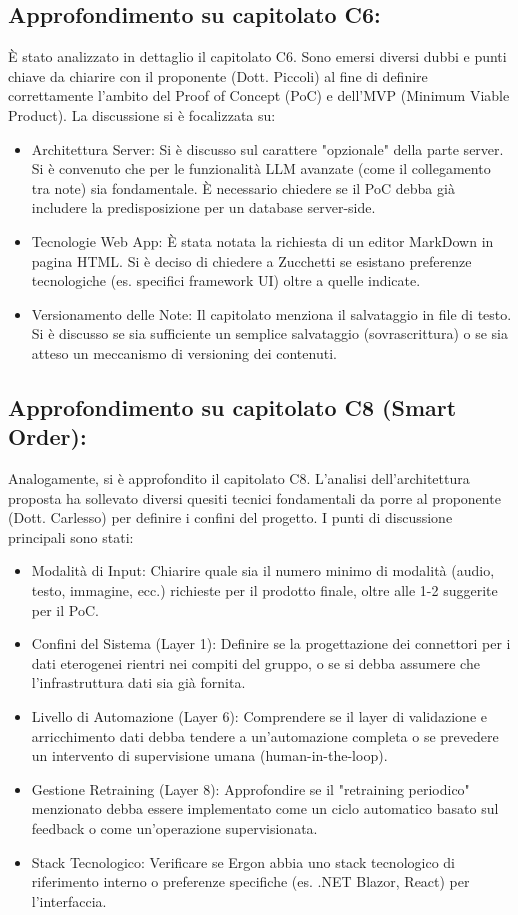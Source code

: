 \documentclass[a4paper, 11pt, oneside]{scrartcl} %
\begin{document}
\subsection{Approfondimento su capitolato C6:}
È stato analizzato in dettaglio il capitolato C6. Sono emersi diversi dubbi e punti chiave da chiarire con il proponente (Dott. Piccoli) al fine di definire correttamente l'ambito del Proof of Concept (PoC) e dell'MVP (Minimum Viable Product). 
La discussione si è focalizzata su:
\begin{itemize}
    \item Architettura Server: Si è discusso sul carattere "opzionale" della parte server. Si è convenuto che per le funzionalità LLM avanzate (come il collegamento tra note) sia fondamentale. È necessario chiedere se il PoC debba già includere la predisposizione per un database server-side.
    \item Tecnologie Web App: È stata notata la richiesta di un editor MarkDown in pagina HTML. Si è deciso di chiedere a Zucchetti se esistano preferenze tecnologiche (es. specifici framework UI) oltre a quelle indicate.
    \item Versionamento delle Note: Il capitolato menziona il salvataggio in file di testo. Si è discusso se sia sufficiente un semplice salvataggio (sovrascrittura) o se sia atteso un meccanismo di versioning dei contenuti.
\end{itemize}

\subsection{Approfondimento su capitolato C8 (Smart Order):}
Analogamente, si è approfondito il capitolato C8. L'analisi dell'architettura proposta ha sollevato diversi quesiti tecnici fondamentali da porre al proponente (Dott. Carlesso) per definire i confini del progetto. 
I punti di discussione principali sono stati:
\begin{itemize}
    \item Modalità di Input: Chiarire quale sia il numero minimo di modalità (audio, testo, immagine, ecc.) richieste per il prodotto finale, oltre alle 1-2 suggerite per il PoC.
    \item Confini del Sistema (Layer 1): Definire se la progettazione dei connettori per i dati eterogenei rientri nei compiti del gruppo, o se si debba assumere che l'infrastruttura dati sia già fornita.
    \item Livello di Automazione (Layer 6): Comprendere se il layer di validazione e arricchimento dati debba tendere a un'automazione completa o se prevedere un intervento di supervisione umana (human-in-the-loop).
    \item Gestione Retraining (Layer 8): Approfondire se il "retraining periodico" menzionato debba essere implementato come un ciclo automatico basato sul feedback o come un'operazione supervisionata.
    \item Stack Tecnologico: Verificare se Ergon abbia uno stack tecnologico di riferimento interno o preferenze specifiche (es. .NET Blazor, React) per l'interfaccia.
\end{itemize}
\end{document}
